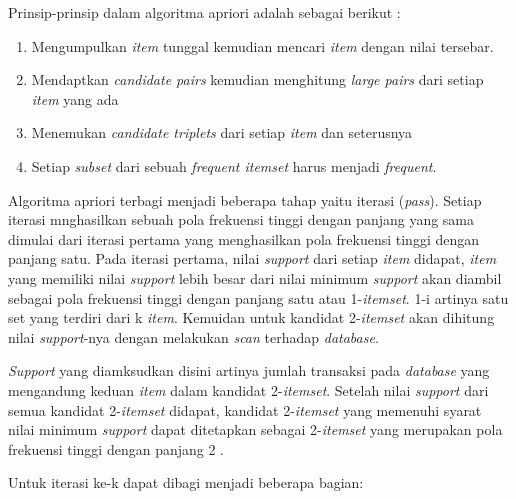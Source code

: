 \par Prinsip-prinsip dalam algoritma apriori adalah sebagai berikut \cite{tampubolon2013implementasi}:
 \begin{enumerate}
\item Mengumpulkan \textit{item} tunggal kemudian mencari \textit{item} dengan nilai tersebar.
\item Mendaptkan \textit{candidate pairs} kemudian menghitung \textit{large pairs} dari setiap \textit{item} yang ada
\item Menemukan \textit{candidate triplets} dari setiap \textit{item} dan seterusnya
\item Setiap \textit{subset} dari sebuah \textit{frequent itemset} harus menjadi \textit{frequent}.
\end{enumerate}

\pagebreak
\par Algoritma apriori terbagi menjadi beberapa tahap yaitu iterasi (\textit{pass}). Setiap iterasi mnghasilkan sebuah pola frekuensi tinggi dengan panjang yang sama dimulai dari iterasi pertama yang menghasilkan pola frekuensi tinggi dengan panjang satu. Pada iterasi pertama, nilai \textit{support} dari setiap \textit{item} didapat, \textit{item} yang memiliki nilai \textit{support} lebih besar dari nilai minimum \textit{support} akan diambil sebagai pola frekuensi tinggi dengan panjang satu atau 1-\textit{itemset}. 1-i artinya satu set yang terdiri dari k \textit{item}. Kemuidan untuk kandidat 2-\textit{itemset} akan dihitung nilai \textit{support}-nya dengan melakukan \textit{scan} terhadap \textit{database}.
\par
\textit{Support} yang diamksudkan disini artinya jumlah transaksi pada \textit{database} yang mengandung keduan \textit{item} dalam kandidat 2-\textit{itemset}. Setelah nilai \textit{support} dari semua kandidat 2-\textit{itemset} didapat, kandidat 2-\textit{itemset} yang memenuhi syarat nilai minimum \textit{support} dapat ditetapkan sebagai 2-\textit{itemset} yang merupakan pola frekuensi tinggi dengan panjang 2 \cite{nursikuwagus2016implementasi}.
\par
Untuk iterasi ke-k dapat dibagi menjadi beberapa bagian:
